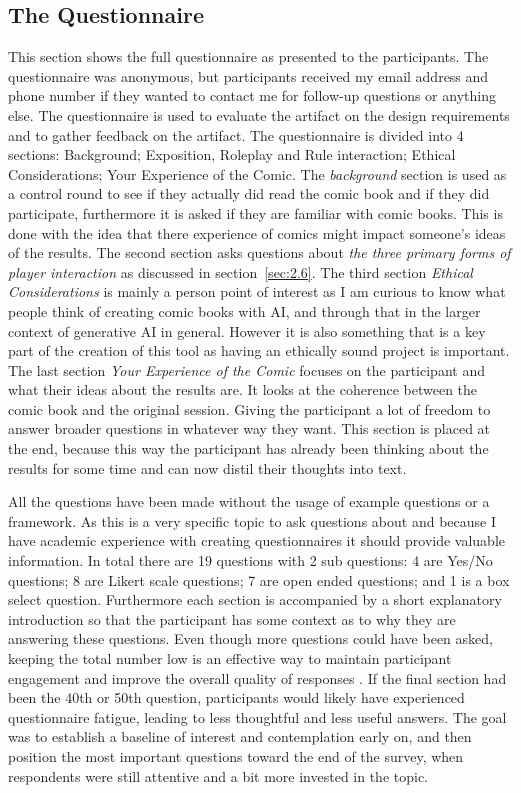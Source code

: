 \subsection*{The Questionnaire}
This section shows the full questionnaire as presented to the participants. The questionnaire was anonymous, but participants received my email address and phone number if they wanted to contact me for follow-up questions or anything else. The questionnaire is used to evaluate the artifact on the design requirements and to gather feedback on the artifact. 
The questionnaire is divided into 4 sections: Background; Exposition, Roleplay and Rule interaction; Ethical Considerations; Your Experience of the Comic. The \textit{background} section is used as a control round to see if they actually did read the comic book and if they did participate, furthermore it is asked if they are familiar with comic books. This is done with the idea that there experience of comics might impact someone's ideas of the results. The second section asks questions about \textit{the three primary forms of player interaction} as discussed in section~\ref{sec:2.6}. The third section \textit{Ethical Considerations} is mainly a person point of interest as I am curious to know what people think of creating comic books with AI, and through that in the larger context of generative AI in general. However it is also something that is a key part of the creation of this tool as having an ethically sound project is important. The last section \textit{Your Experience of the Comic} focuses on the participant and what their ideas about the results are. It looks at the coherence between the comic book and the original session. Giving the participant a lot of freedom to answer broader questions in whatever way they want. This section is placed at the end, because this way the participant has already been thinking about the results for some time and can now distil their thoughts into text. 

All the questions have been made without the usage of example questions or a framework. As this is a very specific topic to ask questions about and because I have academic experience with creating questionnaires it should provide valuable information. In total there are 19 questions with 2 sub questions: 4 are Yes/No questions; 8 are Likert scale questions; 7 are open ended questions; and 1 is a box select question. Furthermore each section is accompanied by a short explanatory introduction so that the participant has some context as to why they are answering these questions. Even though more questions could have been asked, keeping the total number low is an effective way to maintain participant engagement and improve the overall quality of responses \cite{sharma2022short}. If the final section had been the 40th or 50th question, participants would likely have experienced questionnaire fatigue, leading to less thoughtful and less useful answers. The goal was to establish a baseline of interest and contemplation early on, and then position the most important questions toward the end of the survey, when respondents were still attentive and a bit more invested in the topic.


